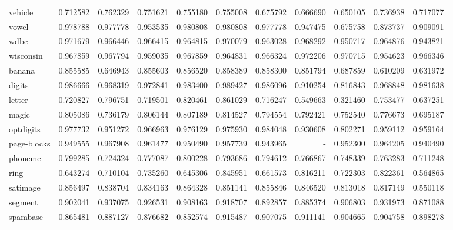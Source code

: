 \begin{tabular}{lrrrrrrrrrr}
vehicle         &   0.712582 &  0.762329 &  0.751621 &  0.755180 &  0.755008 &  0.675792 &  0.666690 &  0.650105 &  0.736938 &  0.717077 \\
vowel           &   0.978788 &  0.977778 &  0.953535 &  0.980808 &  0.980808 &  0.977778 &  0.947475 &  0.675758 &  0.873737 &  0.909091 \\
wdbc            &   0.971679 &  0.966446 &  0.966415 &  0.964815 &  0.970079 &  0.963028 &  0.968292 &  0.950717 &  0.964876 &  0.943821 \\
wisconsin       &   0.967859 &  0.967794 &  0.959035 &  0.967859 &  0.964831 &  0.966324 &  0.972206 &  0.970715 &  0.954623 &  0.966346 \\
banana          &   0.855585 &  0.646943 &  0.855603 &  0.856520 &  0.858389 &  0.858300 &  0.851794 &  0.687859 &  0.610209 &  0.631972 \\
digits          &   0.986666 &  0.968319 &  0.972841 &  0.983400 &  0.989427 &  0.986096 &  0.910254 &  0.816843 &  0.968848 &  0.981638 \\
letter          &   0.720827 &  0.796751 &  0.719501 &  0.820461 &  0.861029 &  0.716247 &  0.549663 &  0.321460 &  0.753477 &  0.637251 \\
magic           &   0.805086 &  0.736179 &  0.806144 &  0.807189 &  0.814527 &  0.794554 &  0.792421 &  0.752540 &  0.776673 &  0.695187 \\
optdigits       &   0.977732 &  0.951272 &  0.966963 &  0.976129 &  0.975930 &  0.984048 &  0.930608 &  0.802271 &  0.959112 &  0.959164 \\
page-blocks     &   0.949555 &  0.967908 &  0.961477 &  0.950490 &  0.957739 &  0.943965 &       - &  0.952300 &  0.964205 &  0.940490 \\
phoneme         &   0.799285 &  0.724324 &  0.777087 &  0.800228 &  0.793686 &  0.794612 &  0.766867 &  0.748339 &  0.763283 &  0.711248 \\
ring            &   0.643274 &  0.710104 &  0.735260 &  0.645306 &  0.845951 &  0.661573 &  0.816211 &  0.722303 &  0.822361 &  0.564865 \\
satimage        &   0.856497 &  0.838704 &  0.834163 &  0.864328 &  0.851141 &  0.855846 &  0.846520 &  0.813018 &  0.817149 &  0.550118 \\
segment         &   0.902041 &  0.937075 &  0.926531 &  0.908163 &  0.918707 &  0.892857 &  0.885374 &  0.906803 &  0.931973 &  0.871088 \\
spambase        &   0.865481 &  0.887127 &  0.876682 &  0.852574 &  0.915487 &  0.907075 &  0.911141 &  0.904665 &  0.904758 &  0.898278 \\

\end{tabular}
